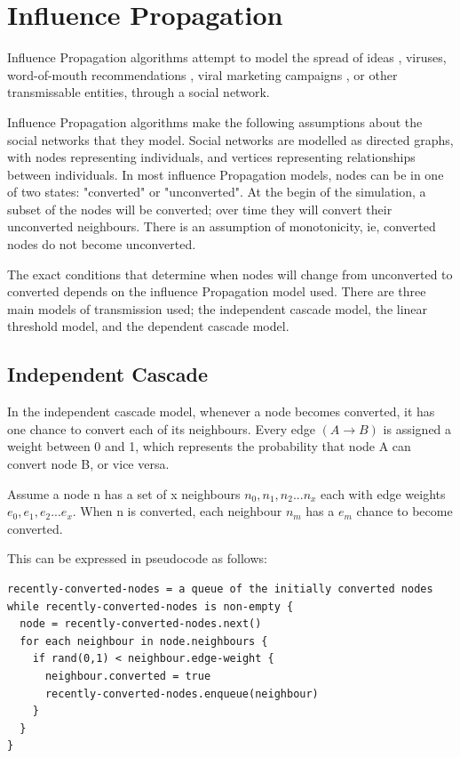 \section{Influence Propagation}

 Influence Propagation algorithms attempt to model the spread of ideas \cite{rogers}, viruses, word-of-mouth recommendations \cite{goldlimul}, viral marketing campaigns \cite{kempe}, or other transmissable entities, through a social network.

Influence Propagation algorithms make the following assumptions about the social networks that they model. Social networks are modelled as directed graphs, with nodes representing individuals, and vertices representing relationships between individuals. In most influence Propagation models, nodes can be in one of two states: "converted" or "unconverted". At the begin of the simulation, a subset of the nodes will be converted; over time they will convert their unconverted neighbours. There is an assumption of monotonicity, ie, converted nodes do not become unconverted.

 The exact conditions that determine when nodes will change from unconverted to converted depends on the influence Propagation model used. There are three main models of transmission used; the independent cascade model, the linear threshold model, and the dependent cascade model.

\subsection{Independent Cascade}
 In the independent cascade model, whenever a node becomes converted, it has one chance to convert each of its neighbours. Every edge \((A \rightarrow B)\) is assigned a weight between 0 and 1, which represents the probability that node A can convert node B, or vice versa.

Assume a node n has a set of x neighbours \(n_0,n_1,n_2...n_x\) each with edge weights \(e_0,e_1,e_2...e_x\). When n is converted, each neighbour \(n_m\) has a \(e_m\) chance to become converted.

This can be expressed in pseudocode as follows:

\begin{verbatim}
recently-converted-nodes = a queue of the initially converted nodes
while recently-converted-nodes is non-empty {
  node = recently-converted-nodes.next()
  for each neighbour in node.neighbours {
    if rand(0,1) < neighbour.edge-weight {
      neighbour.converted = true
      recently-converted-nodes.enqueue(neighbour)
    }
  }
}
\end{verbatim}

